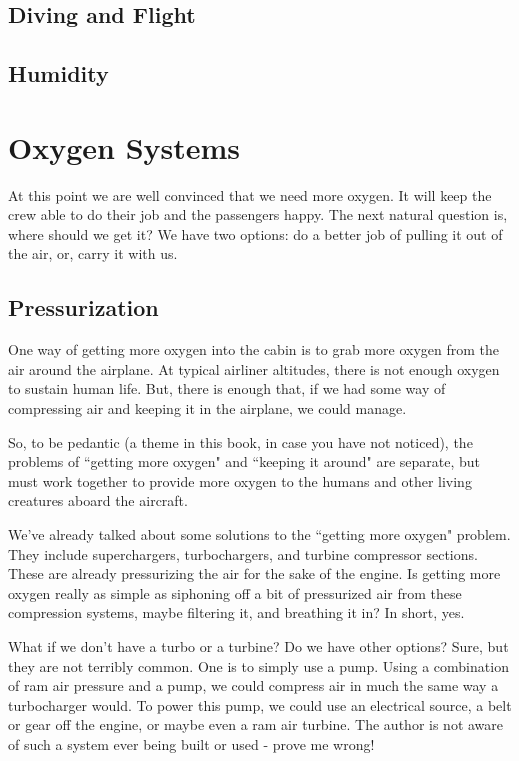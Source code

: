 \subsection{Diving and Flight}

\subsection{Humidity}

\section{Oxygen Systems}

At this point we are well convinced that we need more oxygen. It will keep the crew able to do their job and the passengers happy. The next natural question is, where should we get it? We have two options: do a better job of pulling it out of the air, or, carry it with us.

\subsection{Pressurization}

One way of getting more oxygen into the cabin is to grab more oxygen from the air around the airplane. At typical airliner altitudes, there is not enough oxygen to sustain human life. But, there is enough that, if we had some way of compressing air and keeping it in the airplane, we could manage.

So, to be pedantic (a theme in this book, in case you have not noticed), the problems of ``getting more oxygen" and ``keeping it around" are separate, but must work together to provide more oxygen to the humans and other living creatures aboard the aircraft.

We've already talked about some solutions to the ``getting more oxygen" problem. They include superchargers, turbochargers, and turbine compressor sections. These are already pressurizing the air for the sake of the engine. Is getting more oxygen really as simple as siphoning off a bit of pressurized air from these compression systems, maybe filtering it, and breathing it in? In short, yes.

What if we don't have a turbo or a turbine? Do we have other options? Sure, but they are not terribly common. One is to simply use a pump. Using a combination of ram air pressure and a pump, we could compress air in much the same way a turbocharger would. To power this pump, we could use an electrical source, a belt or gear off the engine, or maybe even a ram air turbine. The author is not aware of such a system ever being built or used - prove me wrong!

